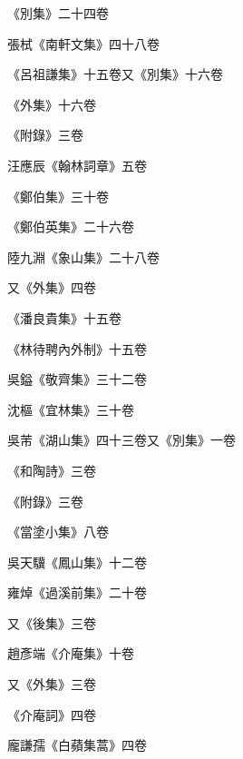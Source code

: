 \begin{pinyinscope}
 《別集》二十四卷



 張栻《南軒文集》四十八卷



 《呂祖謙集》十五卷又《別集》十六卷



 《外集》十六卷



 《附錄》三卷



 汪應辰《翰林詞章》五卷



 《鄭伯集》三十卷



 《鄭伯英集》二十六卷



 陸九淵《象山集》二十八卷



 又《外集》四卷



 《潘良貴集》十五卷



 《林待聘內外制》十五卷



 吳鎰《敬齊集》三十二卷



 沈樞《宜林集》三十卷



 吳芾《湖山集》四十三卷又《別集》一卷



 《和陶詩》三卷



 《附錄》三卷



 《當塗小集》八卷



 吳天驥《鳳山集》十二卷



 雍焯《過溪前集》二十卷



 又《後集》三卷



 趙彥端《介庵集》十卷



 又《外集》三卷



 《介庵詞》四卷



 龐謙孺《白蘋集蒿》四卷




\end{pinyinscope}
